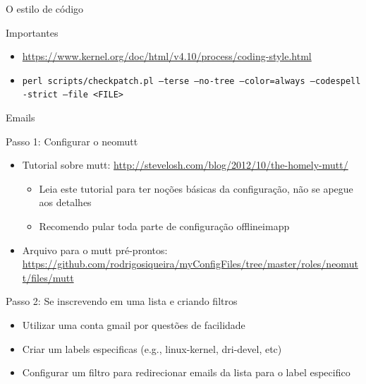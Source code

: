 \documentclass[10pt, compress, aspectratio=169]{beamer}
\begin{document}
\begin{frame}{O estilo de código}

  \begin{exampleblock}{Importantes}
    \begin{itemize}
      \item \url{https://www.kernel.org/doc/html/v4.10/process/coding-style.html}
      \item \texttt{perl scripts/checkpatch.pl --terse --no-tree --color=always --codespell -strict --file <FILE>}
    \end{itemize}
  \end{exampleblock}

\end{frame}

\begin{frame}{Emails}

  Passo 1: Configurar o neomutt
  \begin{itemize}
    \item Tutorial sobre mutt: \url{http://stevelosh.com/blog/2012/10/the-homely-mutt/}
    \begin{itemize}
      \item Leia este tutorial para ter noções básicas da configuração, não se apegue aos detalhes
      \item Recomendo pular toda parte de configuração offlineimapp
    \end{itemize}
    \item Arquivo para o mutt pré-prontos: \url{https://github.com/rodrigosiqueira/myConfigFiles/tree/master/roles/neomutt/files/mutt}
  \end{itemize}

  Passo 2: Se inscrevendo em uma lista e criando filtros
  \begin{itemize}
    \item Utilizar uma conta gmail por questões de facilidade
    \item Criar um labels especificas (e.g., linux-kernel, dri-devel, etc)
    \item Configurar um filtro para redirecionar emails da lista para o label especifico
  \end{itemize}

\end{frame}
\end{document}
